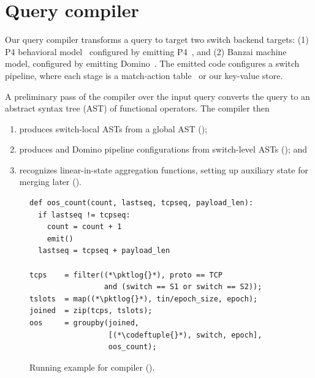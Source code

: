 \section{Query compiler}
\label{sec:compiler}

Our query compiler transforms a \TheSystem query to target two switch backend
targets: (1) P4 behavioral model~\cite{p4-bmv2} configured by emitting
P4~\cite{p4}, and (2) Banzai machine model, configured by emitting
Domino~\cite{domino_sigcomm}. The emitted code configures a switch pipeline,
where each stage is a match-action table~\cite{openflow} or our key-value store.

A preliminary pass of the compiler over the input query converts the query to an
abstract syntax tree (AST) of functional operators. The compiler then
\begin{enumerate}
\item produces switch-local ASTs from a global AST
  ();
\item produces \pfs and Domino pipeline configurations from switch-level ASTs
  (); and
\item recognizes linear-in-state aggregation functions, setting up
  auxiliary state for merging later ().
\end{enumerate}

\begin{figure}[!t]{
\figcodesize
\begin{lstlisting}
def oos_count(count, lastseq, tcpseq, payload_len):
  if lastseq != tcpseq:
    count = count + 1
    emit()
  lastseq = tcpseq + payload_len

tcps    = filter((*\pktlog{}*), proto == TCP
                 and (switch == S1 or switch == S2));
tslots  = map((*\pktlog{}*), tin/epoch_size, epoch);
joined  = zip(tcps, tslots);
oos     = groupby(joined,
                  [(*\codeftuple{}*), switch, epoch],
                  oos_count);
\end{lstlisting}
}
\caption{Running example for \TheSystem compiler ().}
\label{fig:running-example-code}
\end{figure}

